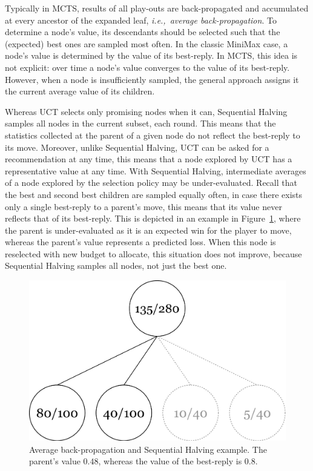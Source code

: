 \documentclass{kecsmstr}
\newcommand{\ie}{{\it i.e.,}~}
\begin{document}
Typically in MCTS, results of all play-outs are back-propagated and accumulated at every ancestor of the expanded leaf, \ie \emph{average back-propagation}. To determine a node's value, its descendants should be selected such that the (expected) best ones are sampled most often. In the classic MiniMax case, a node's value is determined by the value of its best-reply. In MCTS, this idea is not explicit: over time a node's value converges to the value of its best-reply. However, when a node is insufficiently sampled, the general approach assigns it the current average value of its children.

Whereas UCT selects only promising nodes when it can, Sequential Halving samples all nodes in the current subset, each round. This means that the statistics collected at the parent of a given node do not reflect the best-reply to its move. Moreover, unlike Sequential Halving, UCT can be asked for a recommendation at any time, this means that a node explored by UCT has a representative value at any time. With Sequential Halving, intermediate averages of a node explored by the selection policy may be under-evaluated. Recall that the best and second best children are sampled equally often, in case there exists only a single best-reply to a parent's move, this means that its value never reflects that of its best-reply. This is depicted in an example in Figure~\ref{fig:seq_halv_bp}, where the parent is under-evaluated as it is an expected win for the player to move, whereas the parent's value represents a predicted loss. When this node is reselected with new budget to allocate, this situation does not improve, because Sequential Halving samples all nodes, not just the best one.

\begin{figure}[h]
	\centering
	\includegraphics[width=.55\textwidth]{img/seq_halv_bp.png}
	\caption[Sequential Halving back-propagation example]{Average back-propagation and Sequential Halving example. The parent's value $0.48$, whereas the value of the best-reply is $0.8$.}
	\label{fig:seq_halv_bp}
\end{figure}
\end{document}
